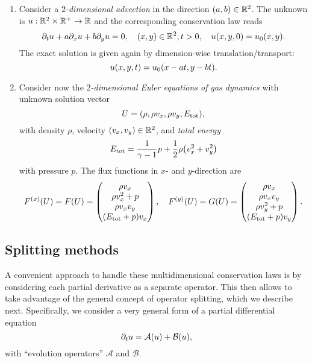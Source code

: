 \begin{example}
	 \begin{enumerate}
	 	\item Consider a \emph{\(2\)-dimensional advection} in the direction \(\parentheses*{a, b} \in \R^2\).
	 	The unknown is \(u: \R^2 \times \R^+ \to \R\) and the corresponding conservation law reads
	 	\[
	 		\partial_t u + a\partial_x u + b\partial_y u = 0, \quad \parentheses*{x, y} \in \R^2, t > 0, \quad u\parentheses*{x, y, 0} = u_0\parentheses*{x, y}.
	 	\]
	 	The exact solution is given again by dimension-wise translation/transport:
	 	\[
	 		u\parentheses*{x, y, t} = u_0\parentheses*{x - at, y - bt}.
	 	\]
	 	\item Consider now the \emph{\(2\)-dimensional Euler equations of gas dynamics} with unknown solution vector
	 	\[
	 		U = \parentheses*{\rho, \rho v_x, \rho v_y, E_{\text{tot}}},
	 	\]
	 	with density \(\rho\), velocity \(\parentheses*{v_x, v_y} \in \R^2\), and \emph{total energy}
	 	\[
	 		E_{\text{tot}} = \frac{1}{\gamma - 1}p + \frac{1}{2}\rho\parentheses*{v_x^2 + v_y^2}
	 	\]
	 	with pressure \(p\).
	 	The flux functions in \(x\)- and \(y\)-direction are
	 	\[
	 		F^{\parentheses*{x}}\parentheses*{U} = F\parentheses*{U} = \begin{pmatrix}
	 			\rho v_x\\
	 			\rho v_x^2 + p\\
	 			\rho v_x v_y\\
	 			\parentheses*{E_{\text{tot}} + p}v_x
	 		\end{pmatrix}, \quad F^{\parentheses*{y}}\parentheses*{U} = G\parentheses*{U} = \begin{pmatrix}
	 			\rho v_x\\
	 			\rho v_x v_y\\
	 			\rho v_y^2 + p\\
	 			\parentheses*{E_{\text{tot}} + p}v_y
	 		\end{pmatrix}.
	 	\]
	 \end{enumerate}
\end{example}


\subsection{Splitting methods}

A convenient approach to handle these multidimensional conservation laws is by considering each partial derivative as a separate operator.
This then allows to take advantage of the general concept of operator splitting, which we describe next.
Specifically, we consider a very general form of a partial differential equation
\[
	\partial_t u = \mathcal{A}\parentheses*{u} + \mathcal{B}\parentheses*{u},
\]
with ``evolution operators'' \(\mathcal{A}\) and \(\mathcal{B}\).

